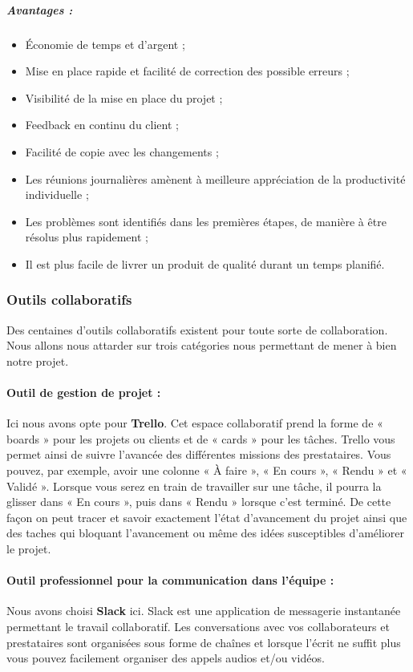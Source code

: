 \subparagraph{Avantages : }
\begin{itemize}
    \item Économie de temps et d'argent ;
    \item Mise en place rapide et facilité de correction des possible erreurs ;
    \item Visibilité de la mise en place du projet ;
    \item Feedback en continu du client ;
    \item Facilité de copie avec les changements ;
    \item Les réunions journalières amènent à meilleure appréciation de la productivité individuelle ;
    \item Les problèmes sont identifiés dans les premières étapes, de manière à être résolus plus rapidement ;
    \item Il est plus facile de livrer un produit de qualité durant un temps planifié.
\end{itemize}

\subsubsection{Outils collaboratifs}
Des centaines d’outils collaboratifs existent pour toute sorte de collaboration. Nous allons nous attarder sur trois catégories nous permettant de mener à bien notre projet. 

\paragraph{Outil de gestion de projet : }Ici nous avons opte pour \textbf{Trello}. Cet espace collaboratif prend la forme de « boards » pour les projets ou clients et de « cards » pour les tâches. Trello vous permet ainsi de suivre l’avancée des différentes missions des prestataires. Vous pouvez, par exemple, avoir une colonne « À faire », « En cours », « Rendu » et « Validé ». Lorsque vous serez en train de travailler sur une tâche, il pourra la glisser dans « En cours », puis dans « Rendu » lorsque c’est terminé. De cette façon on peut tracer et savoir exactement l’état d’avancement du projet ainsi que des taches qui bloquant l’avancement ou même des idées susceptibles d’améliorer le projet.

\paragraph{Outil professionnel pour la communication dans l’équipe : } Nous avons choisi \textbf{Slack} ici. Slack est une application de messagerie instantanée permettant le travail collaboratif. Les conversations avec vos collaborateurs et prestataires sont organisées sous forme de chaînes et lorsque l’écrit ne suffit plus vous pouvez facilement organiser des appels audios et/ou vidéos.
